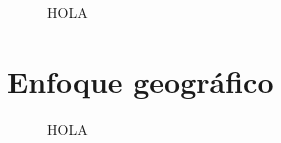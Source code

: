 		\begin{figure}[h]
		\centering
			\caption{HOLA}
			\label{fig:hola}
		\end{figure}
			
			
\section{Enfoque geográfico}

		\begin{figure}[h]
		\centering
			\caption{HOLA}
			\label{fig:hola}
		\end{figure}
